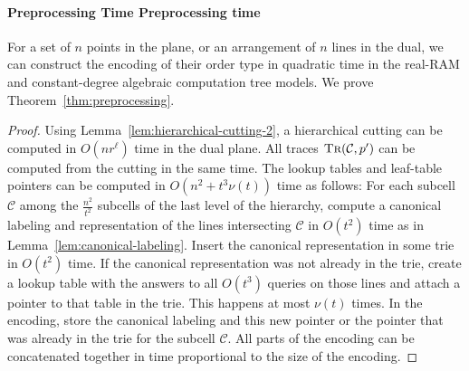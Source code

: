 \paragraph*{\iftitlecase%
Preprocessing Time\else%
Preprocessing time\fi}
For a set of \(n\) points in the plane, or an arrangement of \(n\) lines in the
dual, we can construct the encoding of their order type in quadratic time in
the real-RAM and constant-degree algebraic computation tree models. We prove
Theorem~\ref{thm:preprocessing}. 
\begin{proof}
  Using Lemma~\ref{lem:hierarchical-cutting-2},
  a hierarchical cutting can be computed in \(O(nr^\ell)\) time in the dual
  plane. All traces \(\textsc{Tr}(\mathcal{C}, p')\) can be computed from the cutting
  in the same time. The lookup tables and leaf-table pointers can be computed
  in \(O(n^2 + t^3 \nu(t))\) time as follows: For each subcell \(\mathcal{C}\)
  among the \(\frac{n^2}{t^2}\) subcells of the last level of the hierarchy,
  compute a canonical labeling and representation of the lines intersecting
  \(\mathcal{C}\) in \(O(t^2)\) time as in Lemma~\ref{lem:canonical-labeling}.
  Insert the canonical representation in some trie in \(O(t^2)\)
  time. If the canonical representation was not already in the trie, create a lookup
  table with the answers to all \(O(t^3)\) queries on those lines and attach a
  pointer to that table in the trie. This happens at most \(\nu(t)\) times.
  In the encoding, store the canonical labeling and this new pointer or the
  pointer that was already in the trie for the subcell \(\mathcal{C}\). All
  parts of the encoding can be concatenated together in time proportional to
  the size of the encoding.
\end{proof}
